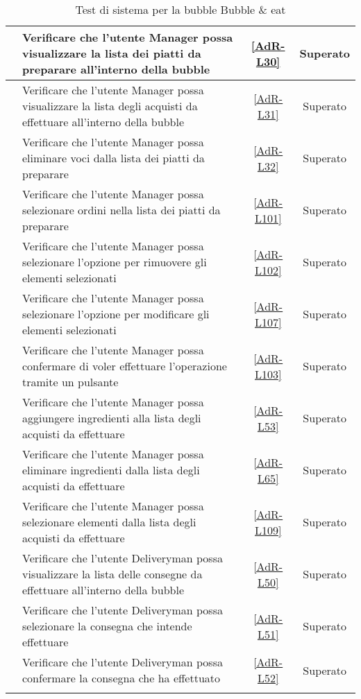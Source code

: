 \begin{longtable}{|c|P{9cm}|c|c|}
	\hline {} & Verificare che l'utente Manager possa visualizzare la lista dei piatti da preparare all’interno della bubble & \ref{AdR-L30} & Superato \\
	\hline {} & Verificare che l'utente Manager possa visualizzare la lista degli acquisti da effettuare all’interno della bubble & \ref{AdR-L31} & Superato \\
	\hline {} & Verificare che l'utente Manager possa eliminare voci dalla lista dei piatti da preparare & \ref{AdR-L32} & Superato \\
	\hline {} & Verificare che l'utente Manager possa selezionare ordini nella lista dei piatti da preparare & \ref{AdR-L101} & Superato \\
	\hline {} & Verificare che l'utente Manager possa selezionare l'opzione per rimuovere gli elementi selezionati & \ref{AdR-L102} & Superato \\
	\hline {} & Verificare che l'utente Manager possa selezionare l'opzione per modificare gli elementi selezionati & \ref{AdR-L107} & Superato \\
	\hline {} & Verificare che l'utente Manager possa confermare di voler effettuare l'operazione tramite un pulsante & \ref{AdR-L103} & Superato \\
	\hline {} & Verificare che l'utente Manager possa aggiungere ingredienti alla lista degli acquisti da effettuare & \ref{AdR-L53}& Superato \\
	\hline {} & Verificare che l'utente Manager possa eliminare ingredienti dalla lista degli acquisti da effettuare & \ref{AdR-L65} & Superato \\
	\hline {} & Verificare che l'utente Manager possa selezionare elementi dalla lista degli acquisti da effettuare & \ref{AdR-L109} & Superato \\
	\hline {} & Verificare che l'utente Deliveryman possa visualizzare la lista delle consegne da effettuare all’interno della bubble & \ref{AdR-L50}  & Superato \\
	\hline {} & Verificare che l'utente Deliveryman possa selezionare la consegna che intende effettuare & \ref{AdR-L51} & Superato \\
	\hline {} & Verificare che l'utente Deliveryman possa confermare la consegna che ha effettuato & \ref{AdR-L52} & Superato \\
	\hline
	\caption{Test di sistema per la bubble Bubble \& eat}
\end{longtable}
